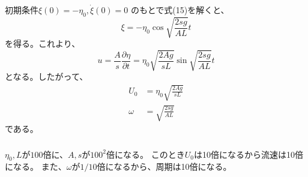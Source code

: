 \documentclass[a4paper]{jsarticle}
\begin{document}
\subsubsection{}
初期条件$\xi(0) = -\eta_0, \dot{\xi}(0) = 0$
のもとで式(15)を解くと、
\begin{equation}
  \xi = -\eta_0 \cos \sqrt{\frac{2 s g}{A L}} t
\end{equation}
を得る。これより、
\begin{equation}
  u = \frac{A}{s} \frac{\partial \eta}{\partial t}
  = \eta_0 \sqrt{\frac{2 A g}{s L}} \sin \sqrt{\frac{2 s g}{A L}} t
\end{equation}
となる。したがって、
\begin{align}
  U_0 &= \eta_0 \sqrt{\frac{2 A g}{s L}} \\
  \omega &= \sqrt{\frac{2 s g}{A L}}
\end{align}
である。

\subsubsection{}
$\eta_0, L$が$100$倍に、$A, s$が$100^2$倍になる。
このとき$U_0$は10倍になるから流速は10倍になる。
また、$\omega$が$1/10$倍になるから、周期は10倍になる。
\end{document}
